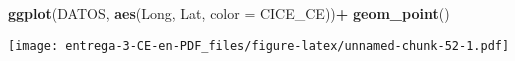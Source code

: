 \documentclass[
]{article}
\newenvironment{Shaded}{\begin{snugshade}}{\end{snugshade}}
\newcommand{\DataTypeTok}[1]{\textcolor[rgb]{0.13,0.29,0.53}{#1}}
\newcommand{\DecValTok}[1]{\textcolor[rgb]{0.00,0.00,0.81}{#1}}
\newcommand{\KeywordTok}[1]{\textcolor[rgb]{0.13,0.29,0.53}{\textbf{#1}}}
\newcommand{\NormalTok}[1]{#1}
\newcommand{\OperatorTok}[1]{\textcolor[rgb]{0.81,0.36,0.00}{\textbf{#1}}}
\newcommand{\StringTok}[1]{\textcolor[rgb]{0.31,0.60,0.02}{#1}}
\begin{document}
\begin{Shaded}
\begin{Highlighting}[]
\KeywordTok{ggplot}\NormalTok{(DATOS, }\KeywordTok{aes}\NormalTok{(Long, Lat, }\DataTypeTok{color =}\NormalTok{ CICE_CE))}\OperatorTok{+}
\StringTok{  }\KeywordTok{geom_point}\NormalTok{()}
\end{Highlighting}
\end{Shaded}

\texttt{[image: entrega-3-CE-en-PDF\_files/figure-latex/unnamed-chunk-52-1.pdf]}

\begin{Shaded}
\end{Shaded}
\end{document}
